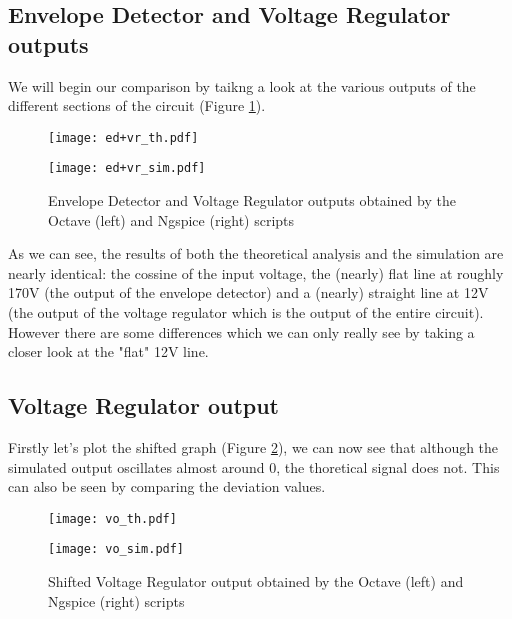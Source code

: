 \subsection{Envelope Detector and Voltage Regulator outputs}
\hspace{12pt} We will begin our comparison by taikng a look at the various outputs of the different sections of the circuit (Figure \ref{fig:ed+vr_comp}).

\begin{figure}[h]
	\begin{minipage}{.45\textwidth}
		\centering
        	\texttt{[image: ed+vr\_th.pdf]}
	\end{minipage}
	\begin{minipage}{.45\textwidth}
		\centering
		\texttt{[image: ed+vr\_sim.pdf]}
	\end{minipage}
	\vspace{-5pt}
	\caption{Envelope Detector and Voltage Regulator outputs obtained by the Octave (left) and Ngspice (right) scripts}
	\label{fig:ed+vr_comp}
\end{figure}

As we can see, the results of both the theoretical analysis and the simulation are nearly identical: the cossine of the input voltage, the (nearly) flat line at roughly 170V (the output of the envelope detector) and a (nearly) straight line at 12V (the output of the voltage regulator which is the output of the entire circuit). However there are some differences which we can only really see by taking a closer look at the "flat" 12V line.

\subsection{Voltage Regulator output}
\hspace{12pt} Firstly let's plot the shifted graph (Figure \ref{fig:vo_comp}), we can now see that although the simulated output oscillates almost around 0, the thoretical signal does not. This can also be seen by comparing the deviation values. 

\begin{figure}[h]
	\begin{minipage}{.4\textwidth}
		\centering
        	\texttt{[image: vo\_th.pdf]}
	\end{minipage}
	\begin{minipage}{.4\textwidth}
		\centering
		\texttt{[image: vo\_sim.pdf]}
	\end{minipage}
	\caption{Shifted Voltage Regulator output obtained by the Octave (left) and Ngspice (right) scripts}
	\label{fig:vo_comp}
\end{figure}


